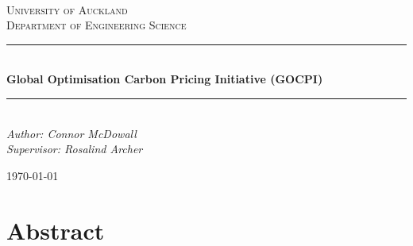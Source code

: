 \documentclass[12pt]{article}
\begin{document}
\begin{titlepage}
	\newcommand{\HRule}{\rule{\linewidth}{0.5mm}} %
	
	\center
	
	
	\textsc{\LARGE }\\[1.5cm] %
	
	\textsc{\Large University of Auckland\\Department of Engineering Science}\\[0.5cm] %
	
	
	\HRule\\[0.5cm]
	
	{\huge\bfseries Global Optimisation Carbon Pricing Initiative (GOCPI)}\\[0.4cm] %
	
	\HRule\\[0.5cm]
	
	
	{\large\textit{Author: Connor McDowall \\Supervisor: Rosalind Archer}}\\
	
	
	\vfill\vfill\vfill %
	
	{\large\today} %
	 
	
	\vfill %
	
\end{titlepage}
\newpage
\section*{Abstract}
\newpage
\end{document}
